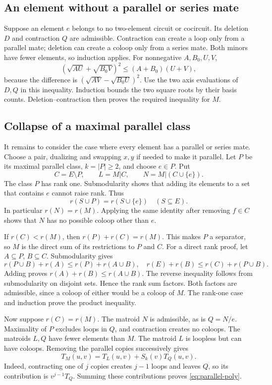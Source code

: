 \documentclass[11pt,a4paper]{article}
\begin{document}
\subsection{An element without a parallel or series mate}
Suppose an element $e$ belongs to no two-element circuit or cocircuit.
Its deletion $D$ and contraction $Q$ are admissible. Contraction can create
a loop only from a parallel mate; deletion can create a coloop only from
a series mate. Both minors have fewer elements, so induction applies.
For nonnegative $A,B_0,U,V$,
\[
(\sqrt{AU}+\sqrt{B_0V})^2\leq(A+B_0)(U+V),
\]
because the difference is $(\sqrt{AV}-\sqrt{B_0U})^2$.
Use the two axis evaluations of $D,Q$ in this inequality.
Induction bounds the two square roots by their basis counts.
Deletion--contraction then proves the required inequality for $M$.

\subsection{Collapse of a maximal parallel class}
It remains to consider the case where every element has a parallel or series mate.
Choose a pair, dualizing and swapping $x,y$ if needed to make it parallel.
Let $P$ be its maximal parallel class, $k=|P|\geq2$, and choose $e\in P$.
Put
\[
C=E\setminus P,\qquad L=M|C,\qquad N=M|(C\cup\{e\}).
\]
The class $P$ has rank one. Submodularity shows that adding its elements
to a set that contains $e$ cannot raise rank. Thus
\begin{equation}\label{eq:parallel-rank}
r(S\cup P)=r(S\cup\{e\})\quad(S\subseteq E).
\end{equation}
In particular $r(N)=r(M)$. Applying the same identity after removing
$f\in C$ shows that $N$ has no possible coloop other than $e$.

If $r(C)<r(M)$, then $r(P)+r(C)=r(M)$. This makes $P$ a separator,
so $M$ is the direct sum of its restrictions to $P$ and $C$.
For a direct rank proof, let $A\subseteq P$, $B\subseteq C$.
Submodularity gives
\[
r(P\cup B)+r(A)\leq r(P)+r(A\cup B),\quad
r(E)+r(B)\leq r(C)+r(P\cup B).
\]
Adding proves $r(A)+r(B)\leq r(A\cup B)$. The reverse inequality follows
from submodularity on disjoint sets. Hence the rank sum factors.
Both factors are admissible, since a coloop of either would be a coloop
of $M$. The rank-one case and induction prove the product inequality.

Now suppose $r(C)=r(M)$. The matroid $N$ is admissible, as is $Q=N/e$.
Maximality of $P$ excludes loops in $Q$, and contraction creates no coloops.
The matroids $L,Q$ have fewer elements than $M$. The matroid $L$ is
loopless but can have coloops. Removing the parallel copies successively
gives
\begin{equation}\label{eq:parallel-poly}
T_M(u,v)=T_L(u,v)+S_k(v)T_Q(u,v).
\end{equation}
Indeed, contracting one of $j$ copies creates $j-1$ loops and leaves $Q$,
so its contribution is $v^{j-1}T_Q$. Summing these contributions proves
\eqref{eq:parallel-poly}.
\end{document}
